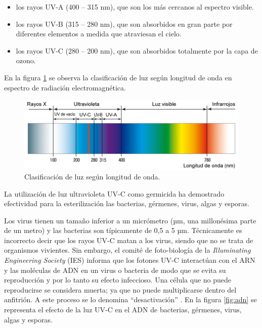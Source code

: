 \begin{itemize}
	\item los rayos UV-A (400 – 315 nm), que son los más cercanos al espectro visible.
	\item los rayos UV-B (315 – 280 nm), que son absorbidos en gran parte por diferentes elementos a medida que atraviesan el cielo.
	\item los rayos UV-C (280 – 200 nm), que son absorbidos totalmente por la capa de ozono.
\end{itemize}

En la  figura \ref{fig:espectro} se observa la  clasificación de luz según longitud de onda en  espectro de radiación electromagnética.

\begin{figure}[h]
	\centering
	\includegraphics[width=14cm]{./Figures/espectro.PNG}
	\caption{Clasificación de luz según longitud de onda\protect\footnotemark.}
	\label{fig:espectro}
\end{figure}


La utilización de luz ultravioleta UV-C como germicida ha demostrado efectividad para la esterilización  las bacterias, gérmenes, virus, algas y esporas. 

Los virus tienen un tamaño inferior a un micrómetro (µm, una millonésima parte de un metro) y las bacterias son típicamente de 0,5 a 5 µm. Técnicamente es incorrecto decir que los rayos  UV-C matan a los virus, siendo que no se trata de organismos vivientes. Sin embargo, el comité de foto-biología de la \emph{ Illuminating Engineering Society} (IES) informa que los fotones UV-C interactúan con el ARN y las moléculas de ADN en un virus o bacteria de modo que se evita su reproducción y por lo tanto su efecto infeccioso. Una célula que no puede reproducirse se considera muerta; ya que no puede multiplicarse dentro del anfitrión. A este proceso se lo denomina “desactivación”   \citep{IES}. En la figura \ref{fig:adn} se representa el efecto de la luz UV-C en el ADN de bacterias, gérmenes, virus, algas y esporas. 
 

